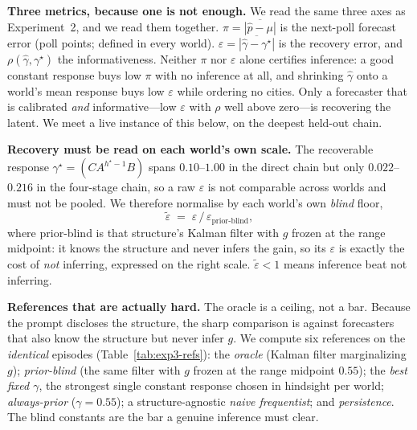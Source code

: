 \textbf{Three metrics, because one is not enough.}  We read the same three axes as Experiment~2, and we
read them together. $\pi=\overline{|\hat p-\mu|}$ is the next-poll forecast error (poll points; defined
in every world). $\varepsilon=\overline{|\hat\gamma-\gamma^\star|}$ is the recovery error, and
$\rho(\hat\gamma,\gamma^\star)$ the informativeness. Neither $\pi$ nor $\varepsilon$ alone certifies
inference: a good constant response buys low $\pi$ with no inference at all, and shrinking $\hat\gamma$
onto a world's mean response buys low $\varepsilon$ while ordering no cities. Only a forecaster that is
calibrated \emph{and} informative---low $\varepsilon$ with $\rho$ well above zero---is recovering the
latent. We meet a live instance of this below, on the deepest held-out chain.

\textbf{Recovery must be read on each world's own scale.}  The recoverable response
$\gamma^\star=(CA^{h^\star-1}B)$ spans $0.10$--$1.00$ in the direct chain but only $0.022$--$0.216$ in
the four-stage chain, so a raw $\varepsilon$ is not comparable across worlds and must not be pooled.
We therefore normalise by each world's own \emph{blind} floor,
\begin{equation}
\tilde\varepsilon \;=\; \varepsilon \,/\, \varepsilon_{\text{prior-blind}},
\label{eq:exp3-epstilde}
\end{equation}
where prior-blind is that structure's Kalman filter with $g$ frozen at the range midpoint: it knows the
structure and never infers the gain, so its $\varepsilon$ is exactly the cost of \emph{not} inferring,
expressed on the right scale. $\tilde\varepsilon<1$ means inference beat not inferring.

\textbf{References that are actually hard.}  The oracle is a ceiling, not a bar. Because the prompt
discloses the structure, the sharp comparison is against forecasters that also know the structure but
never infer $g$. We compute six references on the \emph{identical} episodes (Table~\ref{tab:exp3-refs}):
the \emph{oracle} (Kalman filter marginalizing $g$); \emph{prior-blind} (the same filter with $g$ frozen
at the range midpoint $0.55$); the \emph{best fixed $\gamma$}, the strongest single constant response
chosen in hindsight per world; \emph{always-prior} ($\gamma{=}0.55$); a structure-agnostic \emph{naive
frequentist}; and \emph{persistence}. The blind constants are the bar a genuine inference must clear.

